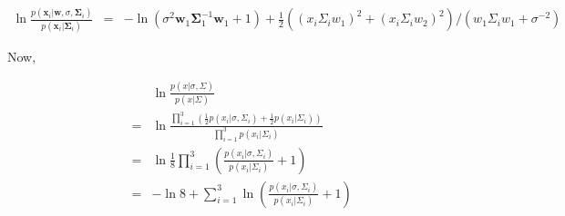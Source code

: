 \documentclass{article}
\begin{document}
\begin{eqnarray}
\ln \frac{p(\mathbf{x}_i|\mathbf{w},\sigma,\mathbf{\Sigma}_i)}
{p(\mathbf{x}_i|\mathbf{\Sigma}_i)}
&=&
-
\ln(\sigma^2\mathbf{w}_1\mathbf{\Sigma}_1^{-1}\mathbf{w}_1+1)
+
\frac{1}{2}
(
(x_i\Sigma_i w_1)^2 + (x_i\Sigma_i w_2)^2
)
/(w_1\Sigma_iw_1+\sigma^{-2})
\end{eqnarray}

Now,

\begin{eqnarray}
&&\ln\frac{p(x|\sigma,\Sigma)}{p(x|\Sigma)}\\
&=&
\ln
\frac{
\prod_{i=1}^3(\frac{1}{2}p(x_i|\sigma,\Sigma_i)+\frac{1}{2}p(x_i|\Sigma_i))}
{\prod_{i=1}^3 p(x_i|\Sigma_i)}
\\
&=&
\ln\frac{1}{8}\prod_{i=1}^3(\frac{p(x_i|\sigma,\Sigma_i)}{p(x_i|\Sigma_i)}+1)
\\
&=&-\ln{8}+\sum_{i=1}^3\ln(\frac{p(x_i|\sigma,\Sigma_i)}{p(x_i|\Sigma_i)}+1)
\end{eqnarray}
\end{document}

